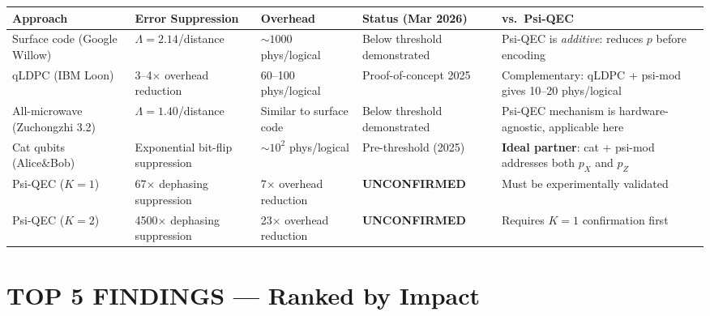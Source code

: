 \documentclass[11pt]{article}
\theoremstyle{definition}
\theoremstyle{remark}
\begin{document}
\begin{longtable}{@{}p{2.8cm}p{2.5cm}p{2.5cm}p{2.5cm}p{2.5cm}@{}}
\toprule
\textbf{Approach} & \textbf{Error Suppression} & \textbf{Overhead} &
\textbf{Status (Mar 2026)} & \textbf{vs.\ Psi-QEC} \\
\midrule
\endhead
Surface code (Google Willow) &
  $\Lambda = 2.14$/distance &
  $\sim 1000$ phys/logical &
  Below threshold demonstrated &
  Psi-QEC is \emph{additive}: reduces $p$ before encoding \\[6pt]

qLDPC (IBM Loon) &
  3--4$\times$ overhead reduction &
  60--100 phys/logical &
  Proof-of-concept 2025 &
  Complementary: qLDPC + psi-mod gives 10--20 phys/logical \\[6pt]

All-microwave (Zuchongzhi 3.2) &
  $\Lambda = 1.40$/distance &
  Similar to surface code &
  Below threshold demonstrated &
  Psi-QEC mechanism is hardware-agnostic, applicable here \\[6pt]

Cat qubits (Alice\&Bob) &
  Exponential bit-flip suppression &
  $\sim 10^2$ phys/logical &
  Pre-threshold (2025) &
  \textbf{Ideal partner}: cat + psi-mod addresses both $p_X$ and $p_Z$ \\[6pt]

Psi-QEC ($K=1$) &
  67$\times$ dephasing suppression &
  7$\times$ overhead reduction &
  \textbf{UNCONFIRMED} &
  Must be experimentally validated \\[6pt]

Psi-QEC ($K=2$) &
  4500$\times$ dephasing suppression &
  23$\times$ overhead reduction &
  \textbf{UNCONFIRMED} &
  Requires $K=1$ confirmation first \\
\bottomrule
\end{longtable}

\section*{TOP 5 FINDINGS --- Ranked by Impact}
\end{document}
